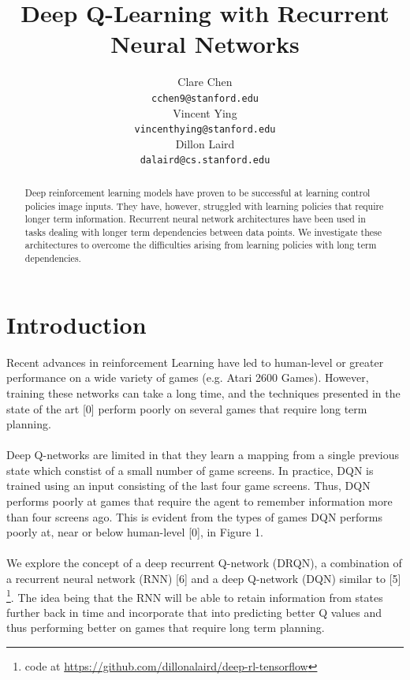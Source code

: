 \documentclass{article}
\title{Deep Q-Learning with Recurrent Neural Networks}
\author{
  Clare Chen \\
  \texttt{cchen9@stanford.edu} \\
  \And
  Vincent Ying \\
  \texttt{vincenthying@stanford.edu} \\
  \And
  Dillon Laird \\
  \texttt{dalaird@cs.stanford.edu} \\
}
\begin{document}

\maketitle

\begin{abstract}
  Deep reinforcement learning models have proven to be successful at learning
  control policies image inputs. They have, however, struggled with learning
  policies that require longer term information. Recurrent neural network
  architectures have been used in tasks dealing with longer term dependencies
  between data points. We investigate these architectures to overcome the
  difficulties arising from learning policies with long term dependencies.
\end{abstract}


\section{Introduction}
    Recent advances in reinforcement Learning have led to human-level or greater
    performance on a wide variety of games (e.g. Atari 2600 Games). However,
    training these networks can take a long time, and the techniques presented in
    the state of the art [0] perform poorly on several games that require long
    term planning. \\
    \\
    Deep Q-networks are limited in that they learn a mapping from a single
    previous state which constist of a small number of game screens. In practice,
    DQN is trained using an input consisting of the last four game screens. Thus,
    DQN performs poorly at games that require the agent to remember information
    more than four screens ago. This is evident from the types of games DQN performs
    poorly at, near or below human-level [0], in Figure 1. \\
    \\
    We explore the concept of a deep recurrent Q-network (DRQN), a combination of
    a recurrent neural network (RNN) [6] and a deep Q-network (DQN) similar to [5]
    \footnote{code at \url{https://github.com/dillonalaird/deep-rl-tensorflow}}.
    The idea being that the RNN will be able to retain information from states
    further back in time and incorporate that into predicting better Q values
    and thus performing better on games that require long term planning. \\
\end{document}
